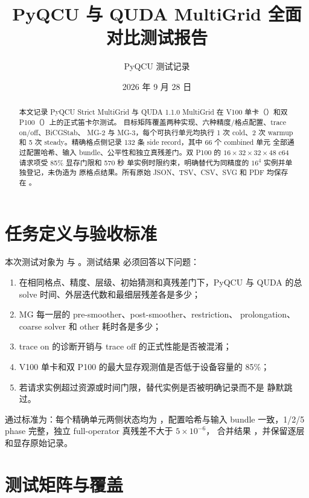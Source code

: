 \documentclass[UTF8,a4paper,11pt]{ctexart}
\title{PyQCU 与 QUDA MultiGrid 全面对比测试报告}
\author{PyQCU 测试记录}
\date{2026 年 9 月 28 日}
\newcommand{\code}[1]{\texttt{\detokenize{#1}}}
\begin{document}
\maketitle

\begin{abstract}
本文记录 PyQCU Strict MultiGrid 与 QUDA 1.1.0 MultiGrid 在 V100
单卡（\code{sm_70}）和双 P100（\code{sm_60}）上的正式笛卡尔测试。
目标矩阵覆盖两种实现、六种精度/格点配置、trace on/off、BiCGStab、
MG-2 与 MG-3，每个可执行单元均执行 1 次 cold、2 次 warmup 和 5 次
steady。精确格点侧记录 132 条 side record，其中 66 个 combined 单元
全部通过配置哈希、输入 bundle、公平性和独立真残差门。双 P100 的
$16\times32\times32\times48$ c64 请求项受 85\% 显存门限和 570 秒
单实例时限约束，明确替代为同精度的 $16^4$ 实例并单独登记，未伪造为
原格点结果。所有原始 JSON、TSV、CSV、SVG 和 PDF 均保存在
。
\end{abstract}

\tableofcontents

\section{任务定义与验收标准}

本次测试对象为  与 。测试结果
必须回答以下问题：

\begin{enumerate}
  \item 在相同格点、精度、层级、初始猜测和真残差门下，PyQCU 与 QUDA
        的总 solve 时间、外层迭代数和最细层残差各是多少；
  \item MG 每一层的 pre-smoother、post-smoother、restriction、
        prolongation、coarse solver 和 other 耗时各是多少；
  \item trace on 的诊断开销与 trace off 的正式性能是否被混淆；
  \item V100 单卡和双 P100 的最大显存观测值是否低于设备容量的 85\%；
  \item 若请求实例超过资源或时间门限，替代实例是否被明确记录而不是
        静默跳过。
\end{enumerate}

通过标准为：每个精确单元两侧状态均为 \code{ok}，配置哈希与输入 bundle
一致，1/2/5 phase 完整，独立 full-operator 真残差不大于 $5\times10^{-6}$，
合并结果 \code{fair=true}，并保留逐层和显存原始记录。

\section{测试矩阵与覆盖}
\end{document}

